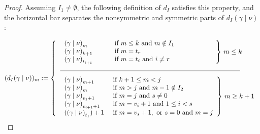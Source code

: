\documentclass[ALCO]{cedram}
\newcommand{\gammanu}{{(\gamma \mid \nu)}}
\newcommand{\dI}{d_I}
\begin{document}
\begin{proof}
Assuming $I_1 \neq \emptyset$, the following definition of $\dI$ satisfies this property, and the horizontal bar separates the nonsymmetric and symmetric parts of $\dI\gammanu$:

\[ (\dI\gammanu)_m := \left\{\begin{tabular}{l l} $ \left.\begin{array}{l l} \gammanu_m  &\text{ if } m\leq k \text{ and } m\notin I_1 \\
\gammanu_{k+1} \hspace*{.7cm} &\text{ if } m=t_r\\
\gammanu_{t_{i+1}} &\text{ if } m=t_i \text{ and } i\neq r\end{array} \hspace{2cm} \right\} \, m \leq k$ \\
\underline{\hspace{9.5cm}}\\[2mm] $\left.\begin{array}{l l} \gammanu_{m+1} &\text{ if } k+1 \leq m < j\\
\gammanu_m &\text{ if } m>j \text{ and } m-1\notin I_2\\
\gammanu_{v_1+1} &\text{ if } m=j \text{ and } s\neq 0\\
\gammanu_{v_{i+1}+1} &\text{ if } m=v_i+1 \text{ and } 1 \leq i < s\\
(\gammanu_{t_1}) + 1&\text{ if } m=v_s+1 , \text{ or }  s=0 \text{ and } m = j \hspace*{0cm} \end{array} \right\} \, m \geq k+1 $ \end{tabular}  \right.\\[1mm]\]


\end{proof}
\end{document}
